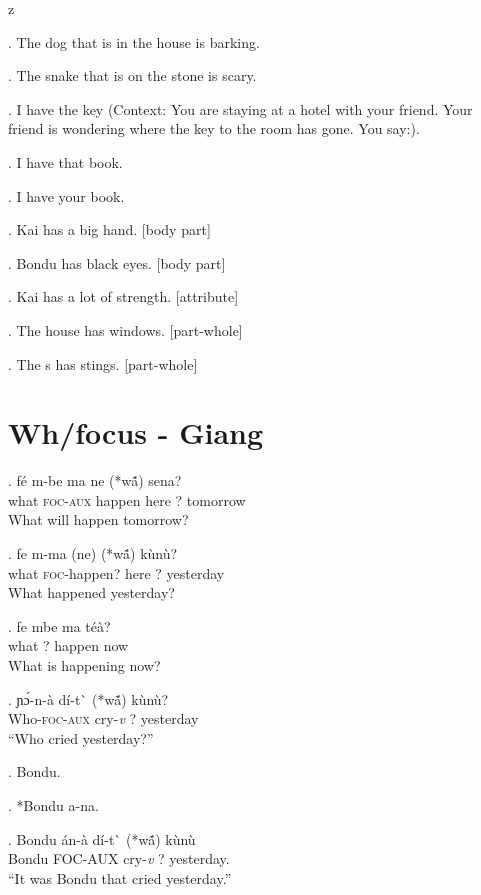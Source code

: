 z   \documentclass{assets/fieldnotes}
\begin{document}
\ex. The dog that is in the house is barking. 

\ex. The snake that is on the stone is scary. 


\ex. I have the key (Context: You are staying at a hotel with your friend. Your friend is wondering
where the key to the room has gone. You say:).

\ex. I have that book.

\ex. I have your book. 

\ex. Kai has a big hand. [body part]

\ex. Bondu has black eyes. [body part]

\ex. Kai has a lot of strength. [attribute]

\ex. The house has windows. [part-whole]

\ex. The s has stings. [part-whole]

\section{Wh/focus - Giang}
\exg. fé m-be ma ne (*wã́) sena?\\
what \textsc{foc-aux} happen here ? tomorrow\\
What will happen tomorrow?

\exg. fe m-ma (ne) (*wã́) kùnù?\\
what \textsc{foc}-happen? here ? yesterday\\
What happened yesterday?

\exg. fe mbe ma téà?\\
what ? happen now\\
What is happening now?

\exg. ɲɔ́-n-à dí-t\`{} (*wã́) kùnù?\\
Who-\textsc{foc-aux} cry-\textit{v} ? yesterday\\
``Who cried yesterday?''

\ex. Bondu.

\ex. *Bondu a-na.

\exg. Bondu án-à dí-t\`{} (*wã́) kùnù\\
Bondu \textsc{FOC-AUX} cry-\textit{v} ? yesterday.\\
``It was Bondu that cried yesterday.''


\end{document}
